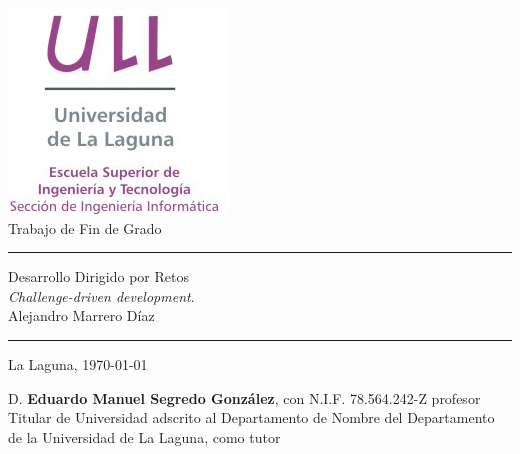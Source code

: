 \documentclass[spanish,a4paper,14pt,oneside]{extreport}
\begin{document}

\pagestyle{empty}
\thispagestyle{empty}


\newcommand{\HRule}{\rule{\linewidth}{1mm}}
\setlength{\parindent}{0mm}
\setlength{\parskip}{0mm}


\begin{center}
\includegraphics[scale=0.8]{images/logo_vertical}\\[10mm]
{\Huge Trabajo de Fin de Grado}
\end{center}

\HRule
\begin{flushright}
        {\Huge Desarrollo Dirigido por Retos} \\[2.5mm]
        {\Large \textit{Challenge-driven development}.} \\[5mm]
        {\Large Alejandro Marrero Díaz} \\[5mm]


\end{flushright}
\HRule
{}
\begin{center}
  \Large La Laguna, \today
\end{center}

\setlength{\parindent}{5mm}

\newpage
\thispagestyle{empty}

D. {\bf Eduardo Manuel Segredo González}, con N.I.F. 78.564.242-Z
profesor
Titular de Universidad
adscrito al Departamento
de Nombre del Departamento
de la Universidad de La Laguna, como tutor
\end{document}
